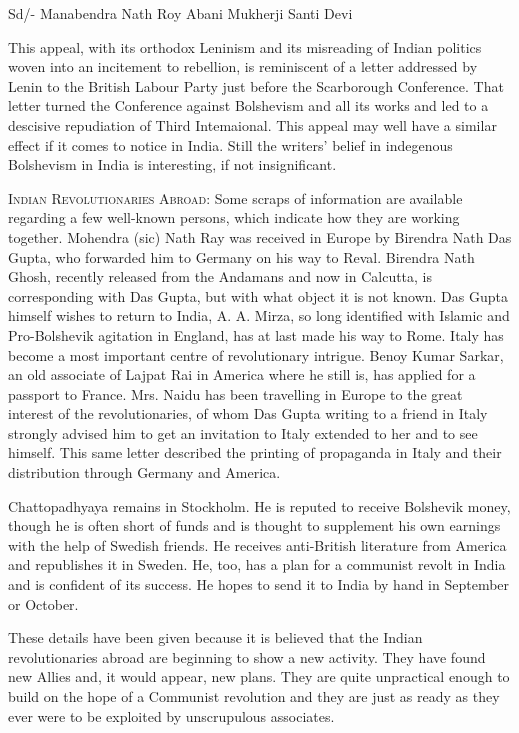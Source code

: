 \begin{flushright}
Sd/- Manabendra Nath Roy 
Abani Mukherji 
Santi Devi
\end{flushright}


This appeal, with its orthodox Leninism and its misreading of Indian politics woven into an incitement to rebellion, is reminiscent of a letter addressed by Lenin to the British Labour Party just before the Scarborough Conference. That letter turned the Conference against Bolshevism and all its works and led to a descisive repudiation of Third Intemaional. This 
appeal may well have a similar effect if it comes to notice in India. Still the writers’ belief in indegenous Bolshevism in India is interesting, if not insignificant. 

\textsc{Indian Revolutionaries Abroad:} Some scraps of information are available regarding a few well-known persons, which indicate how they are working together. Mohendra (sic) Nath Ray was received in Europe by Birendra Nath Das Gupta, who forwarded him to Germany on his way to Reval. Birendra Nath Ghosh, recently released from the Andamans and now in Calcutta, is corresponding with Das Gupta, but with what object it is not known. Das Gupta himself wishes to return to India, A. A. Mirza, so long identified with Islamic and Pro-Bolshevik agitation in England, has at last made his way to Rome. Italy has become a most important centre of revolutionary intrigue. Benoy Kumar Sarkar, an old associate of Lajpat Rai in America where he still is, has applied for a passport to France. Mrs. Naidu has been travelling in Europe to the great interest of the revolutionaries, of whom Das Gupta writing to a friend in Italy strongly advised him to get an invitation to Italy extended to her and to see himself. 
This same letter described the printing of propaganda in Italy and their distribution through Germany and America. 

Chattopadhyaya remains in Stockholm. He is reputed to receive Bolshevik money, though he is often short of funds and is thought to supplement his own earnings with the help of Swedish friends. He receives anti-British literature from America and republishes it in Sweden. He, too, has a plan for a communist revolt in India and is confident of its success. He hopes to send it to India by hand in September or October. 

These details have been given because it is believed that the Indian revolutionaries abroad are beginning to show a new activity. They have found new Allies and, it would appear, new plans. They are quite unpractical enough to build on the hope of a Communist revolution and they are just as ready as they ever were to be exploited by unscrupulous associates. 


